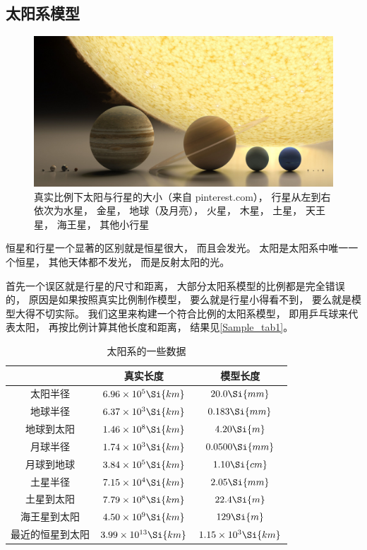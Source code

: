 
\subsection{太阳系模型}

\begin{figure}[ht]
\centering
\includegraphics[width=14cm]{./figures/Astro1.pdf}
\caption{真实比例下太阳与行星的大小（来自 pinterest.com）， 行星从左到右依次为水星， 金星， 地球（及月亮）， 火星， 木星， 土星， 天王星， 海王星， 其他小行星} \label{Astro_fig1}
\end{figure}

恒星和行星一个显著的区别就是恒星很大， 而且会发光。 太阳是太阳系中唯一一个恒星， 其他天体都不发光， 而是反射太阳的光。

首先一个误区就是行星的尺寸和距离， 大部分太阳系模型的比例都是完全错误的， 原因是如果按照真实比例制作模型， 要么就是行星小得看不到， 要么就是模型大得不切实际。 我们这里来构建一个符合比例的太阳系模型， 即用乒乓球来代表太阳， 再按比例计算其他长度和距离， 结果见\autoref{Sample_tab1}。

\begin{table}[ht]
\centering
\caption{太阳系的一些数据}\label{Sample_tab1}
\begin{tabular}{|c|c|c|}
\hline
 & 真实长度 & 模型长度 \\
\hline
太阳半径 & $6.96\times 10^5 \Si{km}$ & $20.0 \Si{mm}$\\
\hline
地球半径 &  $6.37\times 10^3 \Si{km}$ & $0.183 \Si{mm}$\\
\hline
地球到太阳  &  $1.46 \times 10^8 \Si{km}$ & $4.20 \Si{m}$\\
\hline
月球半径 & $1.74 \times 10^3 \Si{km}$ & $0.0500 \Si{mm}$\\
\hline
月球到地球 & $3.84 \times 10^5 \Si{km}$ &  $1.10 \Si{cm}$\\
\hline
土星半径 & $7.15 \times 10^4 \Si{km}$ & $2.05 \Si{mm}$\\
\hline
土星到太阳 & $7.79 \times 10^8 \Si{km}$ & $22.4 \Si{m}$\\
\hline
海王星到太阳 & $4.50 \times 10^9 \Si{km}$ & $129 \Si{m}$\\
\hline
最近的恒星到太阳 & $3.99 \times 10^{13} \Si{km}$ &  $1.15 \times 10^3 \Si{km}$\\
\hline
\end{tabular}
\end{table}

